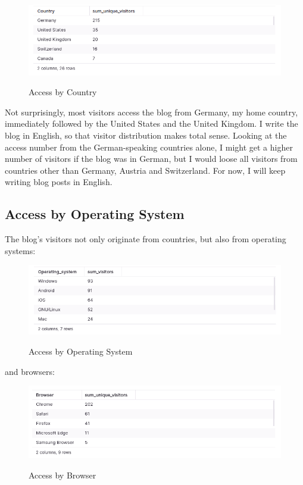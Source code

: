 \begin{figure}[H]
\centering
\caption {Access by Country}
\includegraphics[width=\linewidth]{images/access-country.png}
\label{fig:accessCountry}
\end{figure}

Not surprisingly, most visitors access the blog from Germany, my home country, immediately followed by the United States and the United Kingdom. I write the blog in English, so that visitor distribution makes total sense. Looking at the access number from the German-speaking countries alone, I might get a higher number of visitors if the blog was in German, but I would loose all visitors from countries other than Germany, Austria and Switzerland. For now, I will keep writing blog posts in English.

\subsection{Access by Operating System}

The blog's visitors not only originate from countries, but also from operating systems:

\begin{figure}[H]
\centering
\caption {Access by Operating System}
\includegraphics[width=\linewidth]{images/access-os.png}
\label{fig:accessOS}
\end{figure}

and browsers:

\begin{figure}[H]
\centering
\caption {Access by Browser}
\includegraphics[width=\linewidth]{images/access-browser.png}
\label{fig:accessBrowser}
\end{figure}

